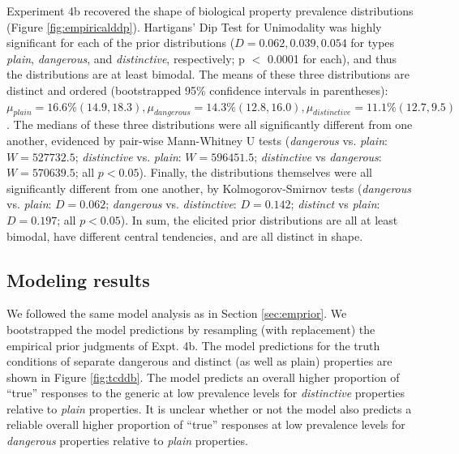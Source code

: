 \documentclass[10pt,letterpaper]{article}
\begin{document}
Experiment 4b recovered the shape of biological property prevalence distributions (Figure \ref{fig:empiricalddp}). 
%
Hartigans' Dip Test for Unimodality was highly significant for each of the prior distributions ($D = 0.062, 0.039, 0.054$ for types \emph{plain}, \emph{dangerous}, and \emph{distinctive}, respectively; p $<$ 0.0001 for each), and thus the distributions are at least bimodal. 
%
The means of these three distributions are distinct and ordered (bootstrapped 95\% confidence intervals in parentheses): $\mu_{plain} = 16.6\% (14.9, 18.3), \mu_{dangerous} = 14.3\% (12.8, 16.0), \mu_{distinctive} = 11.1\% (12.7, 9.5)$.
%
The medians of these three distributions were all significantly different from one another, evidenced by pair-wise Mann-Whitney U tests (\emph{dangerous} vs. \emph{plain}: $W=527732.5$; \emph{distinctive} vs. \emph{plain}: $W=596451.5$; \emph{distinctive} vs \emph{dangerous}: $W=570639.5$; all $p < 0.05$). 
%
Finally, the distributions themselves were all significantly different from one another, by Kolmogorov-Smirnov tests (\emph{dangerous} vs. \emph{plain}: $D = 0.062$;  \emph{dangerous} vs. \emph{distinctive}: $D = 0.142$; \emph{distinct} vs \emph{plain}: $D = 0.197$; all $p < 0.05$). In sum, the elicited prior distributions are all at least bimodal, have different central tendencies, and are all distinct in shape.


\subsection{Modeling results}

We followed the same model analysis as in Section \ref{sec:emprior}. We bootstrapped the model predictions by resampling (with replacement) the empirical prior judgments of Expt. 4b. The model predictions for the truth conditions of separate dangerous and distinct (as well as plain) properties are shown in Figure \ref{fig:tcddb}. The model predicts an overall higher proportion of ``true'' responses to the generic at low prevalence levels for \emph{distinctive} properties relative to \emph{plain} properties. It is unclear whether or not the model also predicts a reliable overall higher proportion of ``true'' responses at low prevalence levels for \emph{dangerous} properties relative to \emph{plain} properties. 
\end{document}
